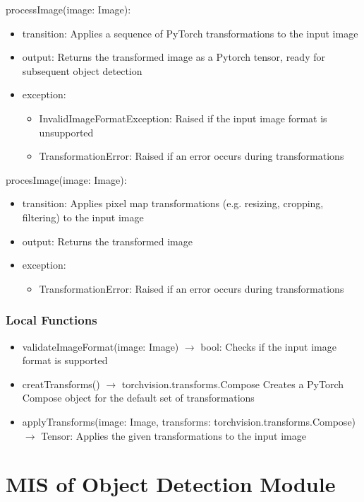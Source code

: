 \documentclass[12pt, titlepage]{article}
\begin{document}
\noindent processImage(image: Image):
\begin{itemize}
\item transition: Applies a sequence of PyTorch transformations to the input image 
\item output: Returns the transformed image as a Pytorch tensor, ready for subsequent object detection
\item exception: 
\begin{itemize}
  \item InvalidImageFormatException: Raised if the input image format is unsupported
  \item TransformationError: Raised if an error occurs during transformations
\end{itemize}

\end{itemize}
\noindent procesImage(image: Image):
\begin{itemize}
  \item transition: Applies pixel map transformations (e.g. resizing, cropping, filtering) to the input image
  \item output: Returns the transformed image
  \item exception: 
  \begin{itemize}
    \item TransformationError: Raised if an error occurs during transformations
  \end{itemize}
  
  \end{itemize}

\subsubsection{Local Functions}

\begin{itemize}
  \item validateImageFormat(image: Image) $\rightarrow$ bool: Checks if the input image format is supported
  \item creatTransforms() $\rightarrow$ torchvision.transforms.Compose\: Creates a PyTorch Compose object for the default set of transformations
  \item applyTransforms(image: Image, transforms: torchvision.transforms.Compose) $\rightarrow$ Tensor: Applies the given transformations to the input image
\end{itemize}

\newpage

\section{MIS of Object Detection Module} \label{Module} 
\end{document}
